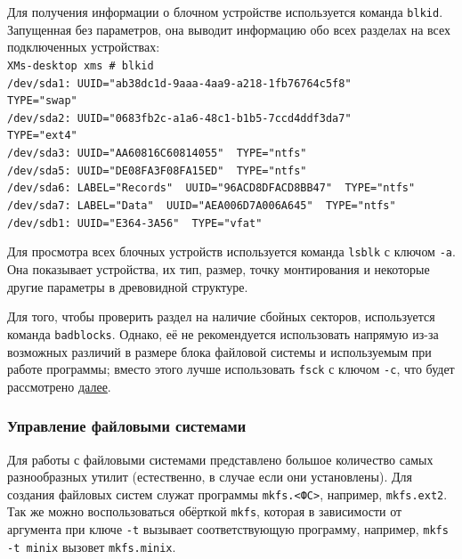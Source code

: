 Для получения информации о блочном устройстве используется команда \texttt{blkid}. Запущенная без параметров, она выводит информацию обо всех разделах на всех подключенных устройствах:\\
 \texttt{XMs-desktop xms \# blkid \\
 /dev/sda1: UUID="ab38dc1d-9aaa-4aa9-a218-1fb76764c5f8"\\ TYPE="swap"\\
 /dev/sda2: UUID="0683fb2c-a1a6-48c1-b1b5-7ccd4ddf3da7"\\ TYPE="ext4"\\
 /dev/sda3: UUID="AA60816C60814055"\, TYPE="ntfs"\\
 /dev/sda5: UUID="DE08FA3F08FA15ED"\, TYPE="ntfs"\\
 /dev/sda6: LABEL="Records"\, UUID="96ACD8DFACD8BB47"\, TYPE="ntfs"\\
 /dev/sda7: LABEL="Data"\, UUID="AEA006D7A006A645"\, TYPE="ntfs" \\
 /dev/sdb1: UUID="E364-3A56"\, TYPE="vfat"}

Для просмотра всех блочных устройств используется команда \texttt{lsblk} с ключом \texttt{-a}. Она показывает устройства, их тип, размер, точку монтирования и некоторые другие параметры в древовидной структуре.

Для того, чтобы проверить раздел на наличие сбойных секторов, используется команда \texttt{badblocks}. Однако, её не рекомендуется использовать напрямую из-за возможных различий в размере блока файловой системы и используемым при работе программы; вместо этого лучше использовать \texttt{fsck} с ключом \texttt{-c}, что будет рассмотрено \hyperref[base:os:structure:sysutils:fs]{далее}.

\subsubsection{Управление файловыми системами}\label{base:os:structure:sysutils:fs}
Для работы с файловыми системами представлено большое количество самых разнообразных утилит (естественно, в случае если они установлены). Для создания файловых систем служат программы \texttt{mkfs.<ФС>}, например, \texttt{mkfs.ext2}. Так же можно воспользоваться обёрткой \texttt{mkfs}, которая в зависимости от аргумента при ключе \texttt{-t} вызывает соответствующую программу, например, \texttt{mkfs -t min\-ix} вызовет \texttt{mkfs.mi\-nix}.

